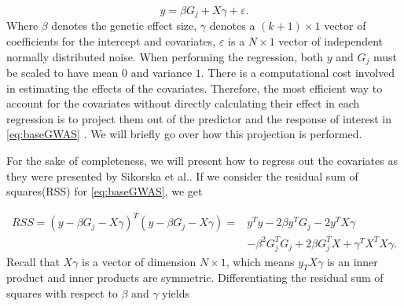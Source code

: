 \begin{equation}\label{eq:baseGWAS}
y = \beta G_{j} +  X\gamma + \varepsilon.
\end{equation}
Where $ \beta $ denotes the genetic effect size, $ \gamma $ denotes a $ (k + 1) \times 1$ vector of coefficients for the intercept and covariates, $ \varepsilon $ is a $ N \times 1 $ vector of independent normally distributed noise. When performing the regression, both $ y $ and $ G_j $ must be scaled to have mean $ 0 $ and variance $ 1 $. There is a computational cost involved in estimating the effects of the covariates. Therefore, the most efficient way to account for the covariates without directly calculating their effect in each regression is to project them out of the predictor and the response of interest in \cref{eq:baseGWAS} \cite{sikorska2013gwas}. We will briefly go over how this projection is performed.

For the sake of completeness, we will present how to regress out the covariates as they were presented by Sikorska et al.\cite{sikorska2013gwas}. If we consider the residual sum of squares(RSS) for \cref{eq:baseGWAS}, we get 

\begin{align}
RSS = \left( y - \beta G_j - X\gamma \right)^T\left( y - \beta G_j - X\gamma \right) = &y^T y - 2\beta y^T G_j - 2y^TX\gamma \\
&- \beta^2 G_j^TG_j + 2\beta G_j^T X + \gamma^T X^T X \gamma.
\end{align}
Recall that $ X\gamma $ is a vector of dimension $ N \times 1 $, which means $ y_T X \gamma $ is an inner product and inner products are symmetric. Differentiating the residual sum of squares with respect to $ \beta $ and $ \gamma $ yields

